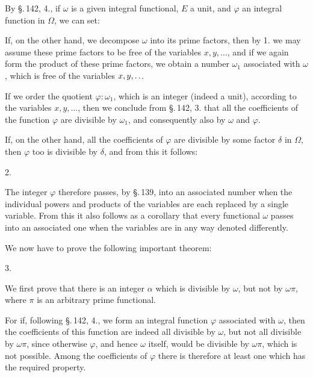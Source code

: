 
By \S.\,142, 4., if $\omega$ is a given integral functional, $E$ a unit, and $\varphi$ an integral function in $\Omega$, we can set:


If, on the other hand, we decompose $\omega$ into its prime factors, then by 1. we may assume these prime factors to be free of the variables $x, y, \ldots$, and if we again form the product of these prime factors, we obtain a number $\omega_1$ associated with $\omega$, which is free of the variables $x, y, \mathinner{.\,.}$.

If we order the quotient $\varphi : \omega_1$, which is an integer (indeed a unit), according to the variables $x, y, \ldots$, then we conclude from \S.\,142, 3. that all the coefficients of the function $\varphi$ are divisible by $\omega_1$, and consequently also by $\omega$ and $\varphi$.

If, on the other hand, all the coefficients of $\varphi$ are divisible by some factor $\delta$ in $\Omega$, then $\varphi$ too is divisible by $\delta$, and from this it follows:

2. 

The integer $\varphi$ therefore passes, by \S.\,139, into an associated number when the individual powers and products of the variables are each replaced by a single variable. From this it also follows as a corollary that every functional $\omega$ passes into an associated one when the variables are in any way denoted differently.

We now have to prove the following important theorem:

3. 

We first prove that there is an integer $\alpha$ which is divisible by $\omega$, but not by $\omega\pi$, where $\pi$ is an arbitrary prime functional.

For if, following \S.\,142, 4., we form an integral function $\varphi$ associated with $\omega$, then the coefficients of this function are indeed all divisible by $\omega$, but not all divisible by $\omega\pi$, since otherwise $\varphi$, and hence $\omega$ itself, would be divisible by $\omega\pi$, which is not possible. Among the coefficients of $\varphi$ there is therefore at least one which has the required property.
